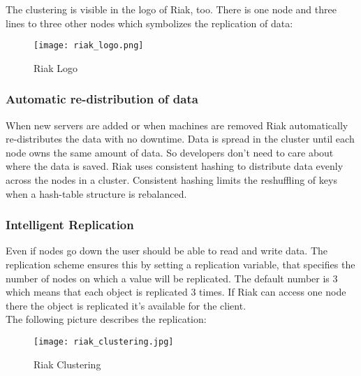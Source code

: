 The clustering is visible in the logo of Riak, too. There is one node and three lines to three other nodes which symbolizes the replication of data:
\begin{figure}[h!]
	\centering
	\texttt{[image: riak\_logo.png]}
	\caption[Riak Logo \protect\cite{Basho.06.04.2017}]{Riak Logo \protect\cite{Basho.06.04.2017}}
	\label{Riak Logo}
\end{figure}

\subsubsection{Automatic re-distribution of data}
When new servers are added or when machines are removed  Riak automatically re-distributes the data with no downtime. Data is spread in the cluster until each node owns the same amount of data. So developers don't need to care about where the data is saved. Riak uses consistent hashing to distribute data evenly across the nodes in a cluster. Consistent hashing limits the reshuffling of keys when a hash-table structure is rebalanced. \cite{Basho.06.04.2017}
\subsubsection{Intelligent Replication}
Even if nodes go down the user should be able to read and write data. The replication scheme ensures this by setting a replication variable, that specifies the number of nodes on which a value will be replicated. The default number is 3 which means that each object is replicated 3 times. If Riak can access one node there the object is replicated it's available for the client. \cite{Basho.06.04.2017}
\\ 
The following picture describes the replication: 
\begin{figure}[h]
	\centering
	\texttt{[image: riak\_clustering.jpg]}
	\caption{Riak Clustering}
	\label{Riak Clustering}
\end{figure}